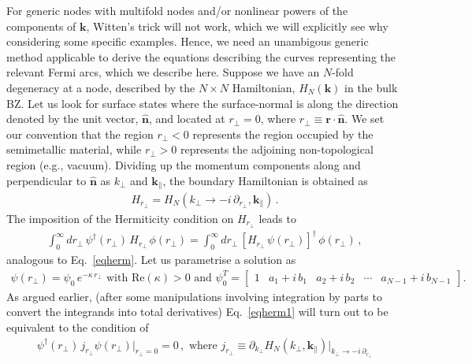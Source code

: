 \documentclass[aps,prb,onecolumn, footinbib, 10pt]{revtex4-2}
\begin{document}
For generic nodes with multifold nodes and/or nonlinear powers of the components of $\mathbf k$, Witten's trick will not work, which we will explicitly see why considering some specific examples. Hence, we need an unambigous generic method applicable to derive the equations describing the curves representing the relevant Fermi arcs, which we describe here. Suppose we have an $N$-fold degeneracy at a node, described by the $N \times N $ Hamiltonian, $H_N (\mathbf k)$ in the bulk BZ. Let us look for surface states where the surface-normal is along the direction denoted by the unit vector, $\boldsymbol{\hat n}$, and located at $r_\perp = 0$, where $ r_\perp \equiv \mathbf r \cdot \boldsymbol{\hat n}$. We set our convention that the region $ r_\perp <0 $ represents the region occupied by the semimetallic material, while $r_\perp >0 $ represents the adjoining non-topological region (e.g., vacuum). Dividing up the momentum components along and perpendicular to $\boldsymbol{\hat n}$ as $  k_\perp$ and $\mathbf k_\parallel $, the boundary Hamiltonian is obtained as
\begin{align}
H_{r_\perp} = H_N ( k_\perp\rightarrow -i \, \partial_{r_\perp} , \mathbf k_\parallel)\,.
\end{align}
The imposition of the Hermiticity condition on $H_{r_\perp}$ leads to
\begin{align}
\label{eqherm1}
 \int_0^\infty  dr_\perp \,\psi^\dagger (r_\perp) \, H_{r_\perp}\,\phi (r_\perp) = 
 \int_0^\infty  dr_\perp\, [ H_{r_\perp}\, \psi(r_\perp) ]^\dagger\,\phi(r_\perp) \,,
\end{align}
analogous to Eq.~\eqref{eqherm}. Let us parametrise a solution as
\begin{align}
\psi (r_\perp) = \psi_0 \, e^{- \kappa \, r_\perp} \text{ with } \text{Re}(\kappa) > 0
\text{ and } 
 \psi_0^T  = \begin{bmatrix}
1 & a_1 +i \, b_1 & a_2 + i \, b_2 & \cdots & a_{N-1} + i \, b_{N-1}
\end{bmatrix}.
\end{align}
As argued earlier, (after some manipulations involving integration by parts to convert the integrands into total derivatives) Eq.~\eqref{eqherm1} will turn out to be equivalent to the condition of
\begin{align}
\label{eqcur}
\psi^\dagger  (r_\perp)\, j_{r_\perp} \psi (r_\perp) \big \vert_{r_\perp=0}= 0\,, \text{ where }
 j_{r_\perp} \equiv \partial_{k_\perp}  H_N(k_\perp,  {\mathbf k_\parallel} ) 
\big \vert_{k_\perp \rightarrow -i\, \partial_{r_\perp} }
\end{align}
\end{document}
